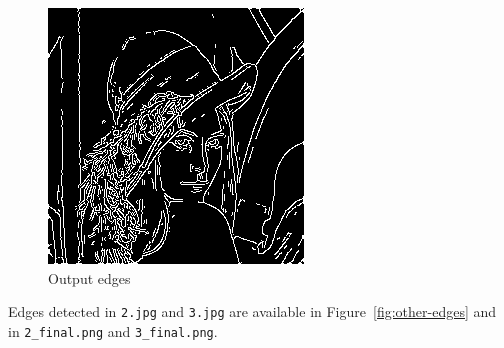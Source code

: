 \documentclass{ee208report}
\begin{document}
\begin{multicols*}{2}
\begin{figure}[H]
    \centering
    \includegraphics[width=0.8\linewidth]{images/1_final.png}
    \caption{Output edges}
    \label{fig:output-edges}
\end{figure}

Edges detected in \texttt{2.jpg} and \texttt{3.jpg} are available in
Figure~\ref{fig:other-edges} and in \texttt{2\_final.png} and
\texttt{3\_final.png}.


\end{multicols*}
\end{document}
